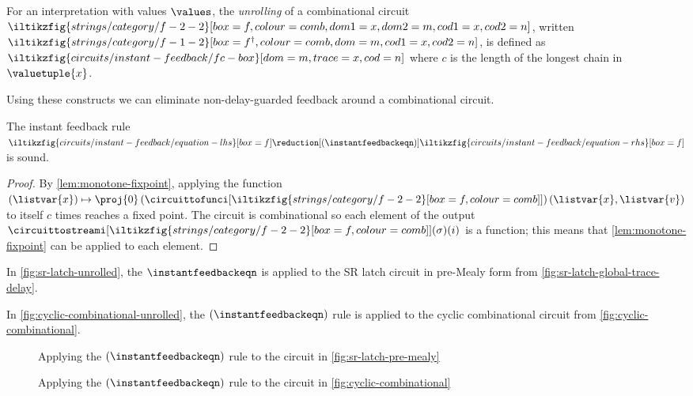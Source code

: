 \documentclass{lmcs}
\begin{document}
\begin{defi}[Unrolling]\label{def:unrolling}
    For an interpretation with values \(\values\), the \emph{unrolling}
    of a combinational circuit \(
    \iltikzfig{strings/category/f-2-2}[box=f,colour=comb,dom1=x,dom2=m,cod1=x,cod2=n]
    \), written \(
    \iltikzfig{strings/category/f-1-2}[box=f^\dagger,colour=comb,dom=m,cod1=x,cod2=n]
    \), is defined as \(
    \iltikzfig{circuits/instant-feedback/fc-box}[dom=m,trace=x,cod=n]
    \) where \(c\) is the length of the longest chain in \(\valuetuple{x}\).
\end{defi}

Using these constructs we can eliminate non-delay-guarded feedback around a
combinational circuit.

\begin{prop}\label{prop:instant-feedback}
    The instant feedback rule \(
    \iltikzfig{circuits/instant-feedback/equation-lhs}[box=f]
    \reduction[(\instantfeedbackeqn)]
    \iltikzfig{circuits/instant-feedback/equation-rhs}[box=f]
    \) is sound.
\end{prop}
\begin{proof}
    By \autoref{lem:monotone-fixpoint}, applying the function \(
    (\listvar{x}) \mapsto \proj{0}\left(\circuittofunci[
        \iltikzfig{strings/category/f-2-2}[box=f,colour=comb]
    ]\right)(\listvar{x}, \listvar{v})\) to itself \(c\) times reaches a
    fixed point.
    The circuit is combinational so each element of the output
    \(\circuittostreami[
        \iltikzfig{strings/category/f-2-2}[box=f,colour=comb]
    ](\sigma)(i)\) is a function; this means that \autoref{lem:monotone-fixpoint}
    can be applied to each element.
\end{proof}

\begin{exa}\label{ex:sr-latch-unrolled}
    In \autoref{fig:sr-latch-unrolled}, the \(\instantfeedbackeqn\) is applied to
    the SR latch circuit in pre-Mealy form from
    \autoref{fig:sr-latch-global-trace-delay}.
\end{exa}

\begin{exa}
    In \autoref{fig:cyclic-combinational-unrolled}, the \((\instantfeedbackeqn)\)
    rule is applied to the cyclic combinational circuit from
    \autoref{fig:cyclic-combinational}.
\end{exa}

\begin{figure}
    \centering
    \caption{
        Applying the \((\instantfeedbackeqn)\) rule to the circuit in
        \autoref{fig:sr-latch-pre-mealy}
    }
    \label{fig:sr-latch-unrolled}
\end{figure}
%
\begin{figure}
    \centering
    \caption{
        Applying the \((\instantfeedbackeqn)\) rule to the circuit in
        \autoref{fig:cyclic-combinational}
    }
    \label{fig:cyclic-combinational-unrolled}
\end{figure}
\end{document}
